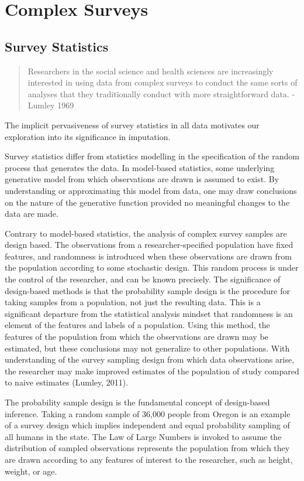 \documentclass[12pt,twoside]{reedthesis}
\begin{document}
\chapter{Complex Surveys}\label{complex-surveys}

\section{Survey Statistics}\label{survey-statistics}
\begin{quote}
Researchers in the social science and health sciences are increasingly
interested in using data from complex surveys to conduct the same sorts
of analyses that they traditionally conduct with more straightforward
data. - Lumley 1969
\end{quote}
The implicit pervasiveness of survey statistics in all data motivates
our exploration into its significance in imputation.

Survey statistics differ from statistics modelling in the specification
of the random process that generates the data. In model-based
statistics, some underlying generative model from which observations are
drawn is assumed to exist. By understanding or approximating this model
from data, one may draw conclusions on the nature of the generative
function provided no meaningful changes to the data are made.

Contrary to model-based statistics, the analysis of complex survey
samples are design based. The observations from a researcher-specified
population have fixed features, and randomness is introduced when these
observations are drawn from the population according to some stochastic
design. This random process is under the control of the researcher, and
can be known precisely. The significance of design-based methods is that
the probability sample design is the procedure for taking samples from a
population, not just the resulting data. This is a significant departure
from the statistical analysis mindset that randomness is an element of
the features and labels of a population. Using this method, the features
of the population from which the observations are drawn may be
estimated, but these conclusions may not generalize to other
populations. With understanding of the survey sampling design from which
data observations arise, the researcher may make improved estimates of
the population of study compared to naive estimates (Lumley, 2011).

The probability sample design is the fundamental concept of design-based
inference. Taking a random sample of 36,000 people from Oregon is an
example of a survey design which implies independent and equal
probability sampling of all humans in the state. The Law of Large
Numbers is invoked to assume the distribution of sampled observations
represents the population from which they are drawn according to any
features of interest to the researcher, such as height, weight, or age.
\end{document}
